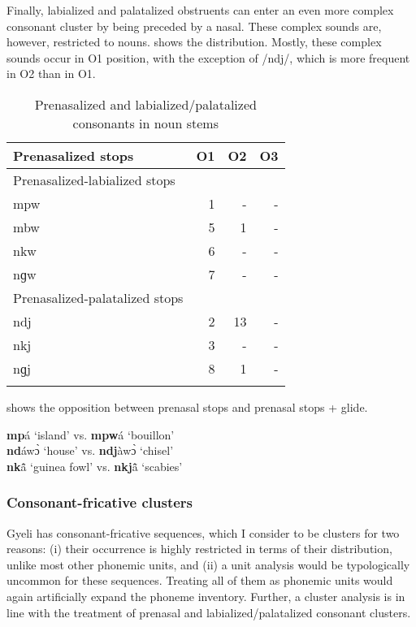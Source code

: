 Finally, labialized and palatalized obstruents can enter an even more complex consonant cluster by being preceded by a nasal. These complex sounds are, however, restricted to nouns.  shows the distribution. Mostly, these complex sounds occur in O1 position, with the exception of /ndj/, which is more frequent in O2 than in O1.

\begin{table}

\begin{tabular}{lrrr}
 \lsptoprule
{Prenasalized stops}  & O1 & O2  & O3   \\
\midrule
 {Prenasalized-labialized stops} &    &  &  \\
                         mpw &  1  & - & - \\
                         mbw &  5  & 1 & - \\
                         nkw &  6  & - &  - \\
                         nɡw  &  7  & - & -  \\
\midrule
{Prenasalized-palatalized stops}  &  &  &   \\
                            ndj  &  2  & 13  &  - \\ 
			    nkj  &  3 & - &  - \\
                           nɡj  &   8 & 1 &  - \\    
 \lspbottomrule
\end{tabular}
\caption{Prenasalized and labialized/palatalized consonants in noun stems}
\label{Tab:PrenCons}
\end{table}

\noindent {} shows the opposition between prenasal stops and prenasal stops + glide.

\ea \label{prenstopglide}
{\bfseries mp}á `island' vs. {\bfseries mpw}á `bouillon' \\
{\bfseries nd}áwɔ̀ `house' vs. {\bfseries ndj}àwɔ̀ `chisel' \\
{\bfseries nk}ã̂ `guinea fowl' vs. {\bfseries nkj}ã̂ `scabies' 
\z

\subsubsection{Consonant-fricative clusters}
\label{sec:Affricates}

Gyeli has consonant-fricative sequences, which I consider to be clusters for two reasons:
 (i) their occurrence is highly restricted in terms of their distribution, unlike most other phonemic units, and (ii) a unit analysis would be typologically uncommon for these sequences. Treating all of them as phonemic units would again artificially expand the phoneme inventory. Further, a cluster analysis is in line with the treatment of prenasal and labialized/palatalized consonant clusters.

